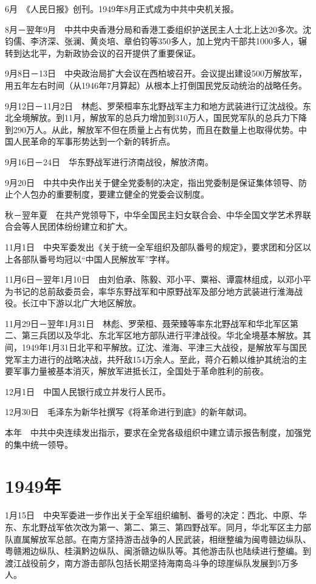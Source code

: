 \documentclass[10pt,a4paper,twocolumn]{book}
\begin{document}
6月　《人民日报》创刊。1949年8月正式成为中共中央机关报。

8月－翌年9月　中共中央香港分局和香港工委组织护送民主人士北上达20多次。沈钧儒、李济深、张澜、黄炎培、章伯钧等350多人，加上党内干部共1000多人，辗转到达北平，为新政协会议的召开提供了重要保证。

9月8日－13日　中央政治局扩大会议在西柏坡召开。会议提出建设500万解放军，用五年左右时间（从1946年7月算起）从根本上打倒国民党反动统治的战略任务。

9月12日－11月2日　林彪、罗荣桓率东北野战军主力和地方武装进行辽沈战役。东北全境解放。到11月，解放军的总兵力增加到310万人，国民党军队的总兵力下降到290万人。从此，解放军不但在质量上占有优势，而且在数量上也取得优势。中国人民革命的军事形势达到一个新的转折点。

9月16日－24日　华东野战军进行济南战役，解放济南。

9月20日　中共中央作出关于健全党委制的决定，指出党委制是保证集体领导、防止个人包办的重要制度，要建立健全的党委会议制度。

秋－翌年夏　在共产党领导下，中华全国民主妇女联合会、中华全国文学艺术界联合会等人民团体纷纷建立和扩大。

11月1日　中央军委发出《关于统一全军组织及部队番号的规定》，要求团和分区以上各部队番号均冠以“中国人民解放军”字样。

11月6日－翌年1月10日　由刘伯承、陈毅、邓小平、粟裕、谭震林组成，以邓小平为书记的总前敌委员会，率华东野战军和中原野战军及部分地方武装进行淮海战役。长江中下游以北广大地区解放。

11月29日－翌年1月31日　林彪、罗荣桓、聂荣臻等率东北野战军和华北军区第二、第三兵团以及华北、东北军区地方部队进行平津战役。华北全境基本解放。其间，1949年1月31日北平和平解放。辽沈、淮海、平津三大战役，是解放军与国民党军主力进行的战略决战，共歼敌154万余人。至此，蒋介石赖以维护其统治的主要军事力量被基本消灭，解放军进抵长江，全国处于革命胜利的前夜。

12月1日　中国人民银行成立并发行人民币。

12月30日　毛泽东为新华社撰写《将革命进行到底》的新年献词。

本年　中共中央连续发出指示，要求在全党各级组织中建立请示报告制度，加强党的集中统一领导。 

\section{1949年}

1月15日　中央军委进一步作出关于全军组织编制、番号的决定：西北、中原、华东、东北野战军依次改为第一、第二、第三、第四野战军。同月，华北军区主力部队直属解放军总部。在南方坚持游击战争的人民武装，相继整编为闽粤赣边纵队、粤赣湘边纵队、桂滇黔边纵队、闽浙赣边纵队等。其他游击队也陆续进行整编。到渡江战役前夕，南方游击部队包括长期坚持海南岛斗争的琼崖纵队发展到5万多人。
\end{document}
